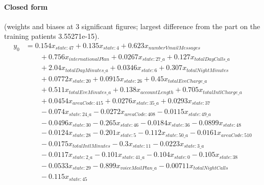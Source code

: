 \documentclass[a4paper,10pt]{article}
\newif\ifreviewmarks
\newcommand{\reviewrule}{\noindent{\color{BrickRed}\rule{\linewidth}{0.8pt}}}
\newenvironment{drafted}[1][]{%
  \ifreviewmarks\par\addvspace{\medskipamount}\reviewrule\par\nopagebreak
  \noindent{\color{BrickRed}\sffamily\footnotesize\textbf{Thesis Draft}\quad #1\hfill review}\par\nopagebreak\smallskip\fi}{%
  \ifreviewmarks\par\smallskip\noindent{\color{BrickRed}\sffamily\footnotesize end of thesis draft}\par\nopagebreak\reviewrule\par\medskip\fi}
\begin{document}
\begin{drafted}[plain-language layer: churn100-s2-c1]
\paragraph{Closed form} {\footnotesize(weights and biases at 3 significant figures; largest difference from the part on the training patients 3.55271e-15).}
{\small\begingroup\allowdisplaybreaks
\begin{align*}
y_{0} &= 0.154 x_{state:47} + 0.135 x_{state:4} + 0.623 x_{numberVmailMessages} \\
&\qquad + 0.756 x_{internationalPlan} + 0.0267 x_{state:27\_a} + 0.127 x_{totalDayCalls\_a} \\
&\qquad + 2.04 x_{totalDayMinutes\_a} + 0.0346 x_{state:6} + 0.307 x_{totalNightMinutes} \\
&\qquad + 0.0772 x_{state:20} + 0.0915 x_{state:26} + 0.45 x_{totalEveCharge\_a} \\
&\qquad + 0.511 x_{totalEveMinutes\_a} + 0.138 x_{accountLength} + 0.705 x_{totalIntlCharge\_a} \\
&\qquad + 0.0454 x_{areaCode:415} + 0.0276 x_{state:35\_a} + 0.0293 x_{state:37} \\
&\qquad - 0.074 x_{state:24\_a} - 0.0272 x_{areaCode:408} - 0.0115 x_{state:49\_a} \\
&\qquad - 0.0496 x_{state:30} - 0.265 x_{state:46} - 0.0184 x_{state:36} - 0.0899 x_{state:48} \\
&\qquad - 0.0124 x_{state:28} - 0.201 x_{state:5} - 0.112 x_{state:50\_a} - 0.0161 x_{areaCode:510} \\
&\qquad - 0.0175 x_{totalIntlMinutes} - 0.3 x_{state:11} - 0.0223 x_{state:3\_a} \\
&\qquad - 0.0117 x_{state:2\_a} - 0.101 x_{state:41\_a} - 0.104 x_{state:0} - 0.105 x_{state:38} \\
&\qquad - 0.0533 x_{state:29} - 0.899 x_{voiceMailPlan\_a} - 0.00711 x_{totalNightCalls} \\
&\qquad - 0.115 x_{state:45}
\end{align*}\endgroup}


\end{drafted}
\end{document}

